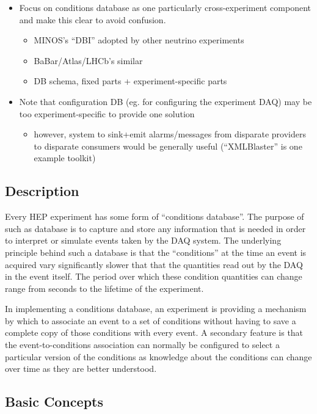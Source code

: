 \begin{itemize}
\item Focus on conditions database as one particularly cross-experiment component and make this clear to avoid confusion.
  \begin{itemize}
  \item MINOS's ``DBI'' adopted by other neutrino experiments
  \item BaBar/Atlas/LHCb's similar
  \item DB schema, fixed parts + experiment-specific parts
  \end{itemize}
\item Note that configuration DB (eg. for configuring the experiment DAQ) may be too experiment-specific to provide one solution
  \begin{itemize}
  \item however, system to sink+emit alarms/messages from disparate providers to disparate consumers would be generally useful (``XMLBlaster'' is one example toolkit)
  \end{itemize}
\end{itemize}

\subsection{Description}

Every HEP experiment has some form of ``conditions database''. The purpose of such as database is to capture and store any information that is needed in order to interpret or simulate events taken by the DAQ system. The underlying principle behind such a database is that the ``conditions'' at the time an event is acquired vary significantly slower that that the quantities read out by the DAQ in the event itself. The period over which these condition quantities can change range from seconds to the lifetime of the experiment.

In implementing a conditions database, an experiment is providing a mechanism by which to associate an event to a set of conditions without having to save a complete copy of those conditions with every event. A secondary feature is that the event-to-conditions association can normally be configured to select a particular version of the conditions as knowledge about the conditions can change over time as they are better understood.

\subsection{Basic Concepts}

